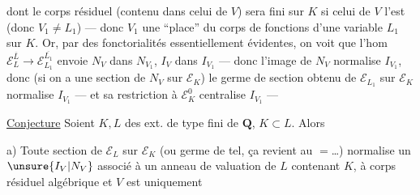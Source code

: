 dont le corps résiduel (contenu dans celui de $V$) sera  fini sur $K$ si celui de $V$ l'est (donc $V_1\ne L_1$) --- donc $V_1$ \deleted{$\longrightarrow$}  une ``place'' du corps de fonctions d'une variable $L_1$ sur $K$. Or, par des fonctorialités essentiellement évidentes, on voit que l'hom $\mathcal E_L^{\overline L}\longrightarrow\mathcal E_{L_1}^{\overline{L_1}}$ envoie $N_V$ dans $N_{V_1}$, $I_V$ dans $I_{V_1}$ --- donc l'image de $N_V$ normalise $I_{V_1}$, donc (si on a une  section de $N_V$ sur $\mathcal E_K$) le germe de section obtenu de $\mathcal E_{L_1}$ sur $\mathcal E_K$ normalise $I_{V_1}$ --- et sa restriction à $\mathcal E_K^0$ centralise $I_{V_1}$ ---

\uline{Conjecture} Soient $K,L$ des ext. de type fini de $\mathbf Q$, $K\subset L$. Alors

a) Toute section de $\mathcal E_L$ sur $\mathcal E_K$ (ou germe de tel, ça revient au $=$\ldots) normalise un $\unsure{I_V|N_V}$ associé à un anneau de valuation  de $L$ contenant $K$, à corps résiduel algébrique  \deleted{\unsure{,}} et  $V$ est uniquement

